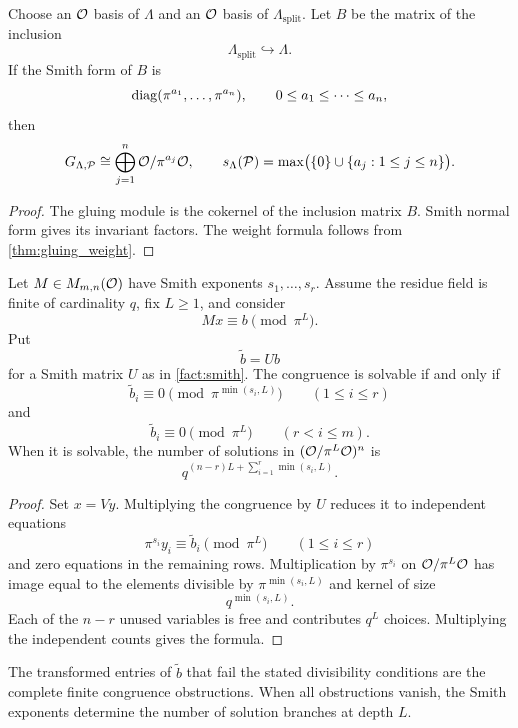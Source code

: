 \begin{proposition}\label{prop:weight_from_inclusion}
Choose an ${\mathcal O}$ basis of $\Lambda$ and an ${\mathcal O}$ basis of $\Lambda_{\mathrm{split}}$.  Let $B$ be the matrix of the inclusion
\[
\Lambda_{\mathrm{split}}\hookrightarrow\Lambda.
\]
If the Smith form of $B$ is
\[
\operatorname{diag}(\pi^{a_1},\ldots,\pi^{a_n}),
\qquad
0\leq a_1\leq\cdots\leq a_n,
\]
then
\[
G_{\Lambda,\mathcal P}
\cong
\bigoplus_{j=1}^n{\mathcal O}/\pi^{a_j}{\mathcal O},
\qquad
s_\Lambda(\mathcal P)=\max\bigl(\{0\}\cup\{a_j:1\leq j\leq n\}\bigr).
\]
\end{proposition}

\begin{proof}
The gluing module is the cokernel of the inclusion matrix $B$.  Smith normal form gives its invariant factors.  The weight formula follows from \cref{thm:gluing_weight}.
\end{proof}

\begin{theorem}\label{thm:smith_congruence}
Let $M\in M_{m,n}({\mathcal O})$ have Smith exponents $s_1,\ldots,s_r$.  Assume the residue field is finite of cardinality $q$, fix $L\geq1$, and consider
\[
Mx\equiv b\pmod{\pi^L}.
\]
Put
\[
\widetilde b=Ub
\]
for a Smith matrix $U$ as in \cref{fact:smith}.  The congruence is solvable if and only if
\[
\widetilde b_i\equiv0
\pmod{\pi^{\min(s_i,L)}}
\qquad(1\leq i\leq r)
\]
and
\[
\widetilde b_i\equiv0
\pmod{\pi^L}
\qquad(r<i\leq m).
\]
When it is solvable, the number of solutions in $({\mathcal O}/\pi^L{\mathcal O})^n$ is
\[
\boxed{
q^{(n-r)L+\sum_{i=1}^r\min(s_i,L)}.
}
\]
\end{theorem}

\begin{proof}
Set $x=Vy$.  Multiplying the congruence by $U$ reduces it to independent equations
\[
\pi^{s_i}y_i\equiv\widetilde b_i\pmod{\pi^L}
\qquad(1\leq i\leq r)
\]
and zero equations in the remaining rows.  Multiplication by $\pi^{s_i}$ on ${\mathcal O}/\pi^L{\mathcal O}$ has image equal to the elements divisible by $\pi^{\min(s_i,L)}$ and kernel of size
\[
q^{\min(s_i,L)}.
\]
Each of the $n-r$ unused variables is free and contributes $q^L$ choices.  Multiplying the independent counts gives the formula.
\end{proof}

\begin{corollary}\label{cor:smith_obstruction}
The transformed entries of $\widetilde b$ that fail the stated divisibility conditions are the complete finite congruence obstructions.  When all obstructions vanish, the Smith exponents determine the number of solution branches at depth $L$.
\end{corollary}

